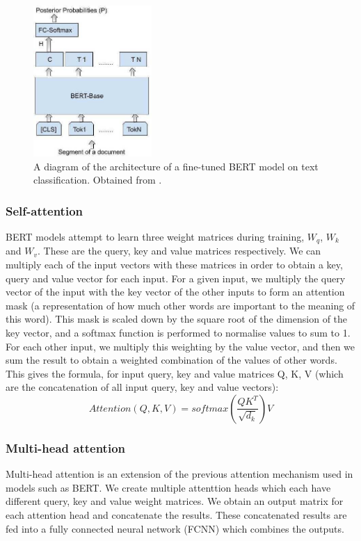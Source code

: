 \documentclass{l4proj}
\begin{document}
 \begin{figure}[h]
\centering
\includegraphics[width=0.4\textwidth]{images/bert finetuning.png}
\caption{A diagram of the architecture of a fine-tuned BERT model on text classification. Obtained from \cite{pappagari2019hierarchical}.}
\label{fig:bert-finetuning}
\end{figure}

\subsubsection{Self-attention} \hfill \par
    BERT models attempt to learn three weight matrices during training, $W_q$, $W_k$ and $W_v$. These are the query, key and value matrices respectively. We can multiply each of the input vectors with these matrices in order to obtain a key, query and value vector for each input. For a given input, we multiply the query vector of the input with the key vector of the other inputs
    to form an attention mask (a representation of how much other words are important to the meaning of this word). This mask is scaled down by the square root of the dimension of the key vector, and a softmax function is performed to normalise values to sum to 1. For each other input, we multiply this weighting by the value vector, and then we sum the result to obtain a weighted combination of the values of other words. This gives the formula, for input query, key and value matrices Q, K, V (which are the concatenation of all input query, key and value vectors):
    $$Attention(Q, K, V) = softmax(\frac{QK^T}{\sqrt{d_k}})V$$
    
\subsubsection{Multi-head attention} \hfill \par
Multi-head attention is an extension of the previous attention mechanism used in models such as BERT. We create multiple attenttion heads which each have different query, key and value weight matrices. We obtain an output matrix for each attention head and concatenate the results. These concatenated results are fed into a fully connected neural network (FCNN) which combines the outputs.
\end{document}
